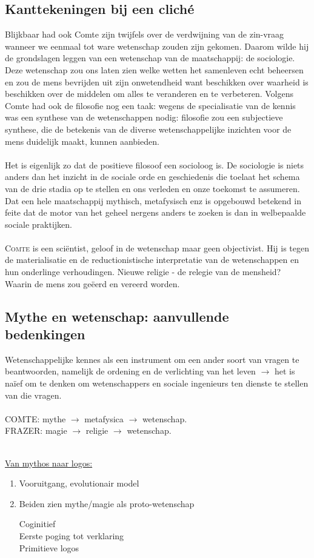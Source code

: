 \documentclass[11pt,a4paper]{article}
\begin{document}
\subsection{Kanttekeningen bij een clich\'e}
Blijkbaar had ook Comte zijn twijfels over de verdwijning van de zin-vraag wanneer we eenmaal tot ware wetenschap zouden zijn gekomen. Daarom wilde hij de grondslagen leggen van een wetenschap van de maatschappij: de sociologie. Deze wetenschap zou ons laten zien welke wetten het samenleven echt beheersen en zou de mens bevrijden uit zijn onwetendheid want beschikken over waarheid is beschikken over de middelen om alles te veranderen en te verbeteren.
Volgens Comte had ook de filosofie nog een taak: wegens de specialisatie van de kennis was een synthese van de wetenschappen nodig: filosofie zou een subjectieve synthese, die de betekenis van de diverse wetenschappelijke inzichten voor de mens duidelijk maakt, kunnen aanbieden.
\\
\\
Het is eigenlijk zo dat de positieve filosoof een socioloog is. De sociologie is niets anders dan het inzicht in de sociale orde en geschiedenis die toelaat het schema van de drie stadia op te stellen en ons verleden en onze toekomst te assumeren. Dat een hele maatschappij mythisch, metafysisch enz is opgebouwd betekend in feite dat de motor van het geheel nergens anders te zoeken is dan in welbepaalde sociale praktijken.
\\
\\
\textsc{Comte} is een sci\"entist, geloof in de wetenschap maar geen objectivist. Hij is tegen de materialisatie en de reductionistische interpretatie van de wetenschappen en hun onderlinge verhoudingen. Nieuwe religie - de relegie van de mensheid? Waarin de mens zou ge\"eerd en vereerd worden.
\subsection{Mythe en wetenschap: aanvullende bedenkingen}
Wetenschappelijke kennes als een instrument om een ander soort van vragen te beantwoorden, namelijk de ordening en de verlichting van het leven $\rightarrow$ het is na\"ief om te denken om wetenschappers en sociale ingenieurs ten dienste te stellen van die vragen.
\\
\\
COMTE: mythe $\longrightarrow$ metafysica $\longrightarrow$ wetenschap.
\\
FRAZER: magie $\longrightarrow$ religie $\longrightarrow$ wetenschap.
\\
\\
\begin{center}
\underline{Van mythos naar logos:}
\end{center}
\begin{enumerate}
\item Vooruitgang, evolutionair model
\item Beiden zien mythe/magie als proto-wetenschap
\begin{flushleft}
Coginitief\\
Eerste poging tot verklaring\\
Primitieve logos
\end{flushleft}
\end{enumerate}
\end{document}
